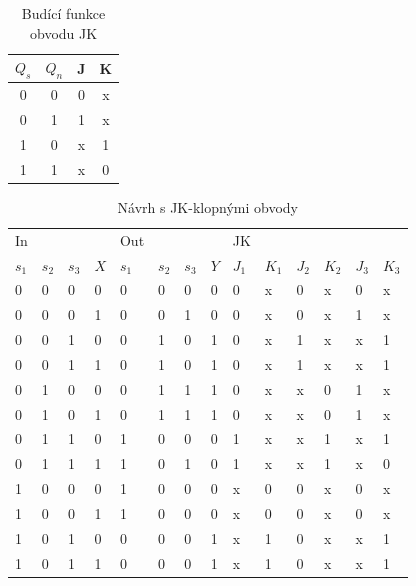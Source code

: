 \begin{table}[htbp]
  \centering
  \caption{Budící funkce obvodu JK}
    \begin{tabular}{cccc}
    $Q_s$    & $Q_n$    & J     & K \\
      \hline
    0     & 0     & 0     & x \\
    0     & 1     & 1     & x \\
    1     & 0     & x     & 1 \\
    1     & 1     & x     & 0 \\
    \end{tabular}%
  \label{tab:addlabel}%
\end{table}%

\begin{table}[htbp]
  \centering
  \caption{Návrh s JK-klopnými obvody}
    \begin{tabular}{llll|llll|llllll}
    In    &       &       &       & Out   &       &       &       & JK    &       &       &       &       &  \\
    $s_1$    & $s_2$    & $s_3$    & $X$     & $s_1$    & $s_2$    & $s_3$    & $Y$    & $J_1$    & $K_1$    & $J_2$    & $K_2$    & $J_3$    & $K_3$ \\
    \hline
    0     & 0     & 0     & 0     & 0     & 0     & 0     & 0     & 0     & x     & 0     & x     & 0     & x \\
    0     & 0     & 0     & 1     & 0     & 0     & 1     & 0     & 0     & x     & 0     & x     & 1     & x \\
    0     & 0     & 1     & 0     & 0     & 1     & 0     & 1     & 0     & x     & 1     & x     & x     & 1 \\
    0     & 0     & 1     & 1     & 0     & 1     & 0     & 1     & 0     & x     & 1     & x     & x     & 1 \\
    0     & 1     & 0     & 0     & 0     & 1     & 1     & 1     & 0     & x     & x     & 0     & 1     & x \\
    0     & 1     & 0     & 1     & 0     & 1     & 1     & 1     & 0     & x     & x     & 0     & 1     & x \\
    0     & 1     & 1     & 0     & 1     & 0     & 0     & 0     & 1     & x     & x     & 1     & x     & 1 \\
    0     & 1     & 1     & 1     & 1     & 0     & 1     & 0     & 1     & x     & x     & 1     & x     & 0 \\
    1     & 0     & 0     & 0     & 1     & 0     & 0     & 0     & x     & 0     & 0     & x     & 0     & x \\
    1     & 0     & 0     & 1     & 1     & 0     & 0     & 0     & x     & 0     & 0     & x     & 0     & x \\
    1     & 0     & 1     & 0     & 0     & 0     & 0     & 1     & x     & 1     & 0     & x     & x     & 1 \\
    1     & 0     & 1     & 1     & 0     & 0     & 0     & 1     & x     & 1     & 0     & x     & x     & 1 \\
    \end{tabular}%
  \label{tab:addlabel}%
\end{table}%

